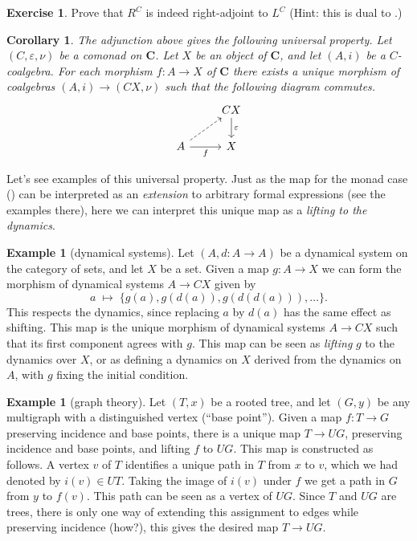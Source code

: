 \documentclass[12pt,oneside]{scrbook}
\numberwithin{equation}{section}
\theoremstyle{plain}
\newtheorem{cor}[thm]{Corollary}
\theoremstyle{definition}
\newtheorem{eg}[thm]{Example}
\newtheorem{ex}[thm]{Exercise}
\newcommand{\cat}[1]{{\mathbf{#1}}} %
\newcommand{\ar}[2][]{\arrow{#2}{#1}}
\newcommand{\uni}[2][]{\arrow[dashrightarrow]{#2}{#1}} %
\newcommand{\e}{\varepsilon}
\DeclareMathOperator{\1}{\mathbbm{1}}
\DeclareMathOperator{\2}{\mathbbm{2}}
\begin{document}
\begin{ex}
 Prove that $R^C$ is indeed right-adjoint to $L^C$ (Hint: this is dual to .)
\end{ex}

\begin{cor}
 The adjunction above gives the following universal property. Let $(C,\e,\nu)$ be a comonad on $\cat{C}$. Let $X$ be an object of $\cat{C}$, and let $(A,i)$ be a $C$-coalgebra. For each morphism $f:A\to X$ of $\cat{C}$ there exists a unique morphism of coalgebras $(A,i)\to (CX,\nu)$ such that the following diagram commutes.
 $$
 \begin{tikzcd}
 & CX \ar{d}{\e} \\
 A \uni{ur} \ar{r}[swap]{f} & X
 \end{tikzcd}
 $$
\end{cor}

Let's see examples of this universal property. Just as the map for the monad case () can be interpreted as an \emph{extension} to arbitrary formal expressions (see the examples there), here we can interpret this unique map as a \emph{lifting to the dynamics}.

\begin{eg}[dynamical systems]
 Let $(A,d:A\to A)$ be a dynamical system on the category of sets, and let $X$ be a set. Given a map $g:A\to X$ we can form the morphism of dynamical systems $A\to CX$ given by 
 $$
 a\;\longmapsto\; \{g(a), g(d(a)), g(d(d(a))),\dots\} .
 $$
 This respects the dynamics, since replacing $a$ by $d(a)$ has the same effect as shifting. This map is the unique morphism of dynamical systems $A\to CX$ such that its first component agrees with $g$. This map can be seen as \emph{lifting} $g$ to the dynamics over $X$, or as defining a dynamics on $X$ derived from the dynamics on $A$, with $g$ fixing the initial condition.
\end{eg}

\begin{eg}[graph theory]
 Let $(T,x)$ be a rooted tree, and let $(G,y)$ be any multigraph with a distinguished vertex (``base point''). Given a map $f:T\to G$ preserving incidence and base points, there is a unique map $T\to UG$, preserving incidence and base points, and lifting $f$ to $UG$. This map is constructed as follows. A vertex $v$ of $T$ identifies a unique path in $T$ from $x$ to $v$, which we had denoted by $i(v)\in UT$. Taking the image of $i(v)$ under $f$ we get a path in $G$ from $y$ to $f(v)$. This path can be seen as a vertex of $UG$. Since $T$ and $UG$ are trees, there is only one way of extending this assignment to edges while preserving incidence (how?), this gives the desired map $T\to UG$. 
\end{eg}
\end{document}
